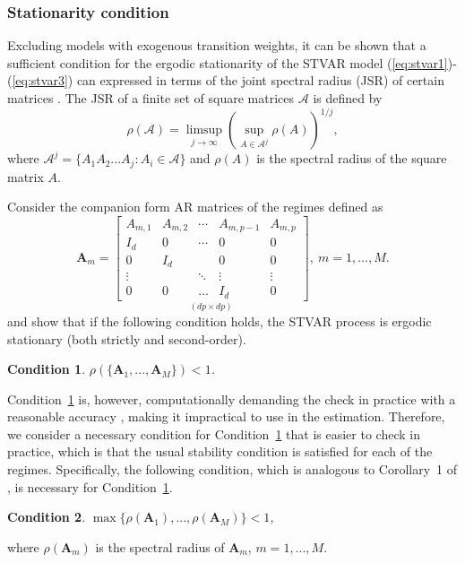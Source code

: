 \documentclass[nojss]{jss}
\newtheorem{condition}{Condition}
\begin{document}
\subsubsection{Stationarity condition}\label{sec:stationarity}
Excluding models with exogenous transition weights, it can be shown that a sufficient condition for the ergodic stationarity of the STVAR model (\ref{eq:stvar1})-(\ref{eq:stvar3}) can expressed in terms of the joint spectral radius (JSR) of certain matrices \citep{Kheifets+Saikkonen:2020}. The JSR of a finite set of square matrices $\mathcal{A}$ is defined by
\begin{equation}
\rho(\mathcal{A}) = \underset{j\rightarrow \infty}{\limsup}\left(\underset{A\in \mathcal{A}^j}{\sup}\rho(A) \right)^{1/j},
\end{equation}
where $\mathcal{A}^j=\lbrace A_1A_2...A_j:A_i\in\mathcal{A}\rbrace$ and $\rho(A)$ is the spectral radius of the square matrix $A$.

Consider the companion form AR matrices of the regimes defined as
\begin{equation}\label{eq:boldA}
\boldsymbol{A}_m =
\underset{(dp\times dp)}{\begin{bmatrix}
A_{m,1} & A_{m,2} & \cdots & A_{m,p-1} & A_{m,p} \\
I_d  & 0     & \cdots & 0            & 0 \\
0     & I_d  &             & 0            & 0 \\
\vdots &   & \ddots & \vdots    & \vdots \\
0     & 0     & \hdots & I_d         & 0
\end{bmatrix}}, \
m=1,...,M.
\end{equation}
\citet[][Theorem 1]{Kheifets+Saikkonen:2020} and \cite{Lanne+Virolainen:2024} \citep[see also][]{Saikkonen:2008} show that if the following condition holds, the STVAR process is ergodic stationary (both strictly and second-order).
\begin{condition}\label{cond:sufficient}
$\rho(\lbrace \boldsymbol{A}_1,...,\boldsymbol{A}_M \rbrace) < 1$.
\end{condition}

Condition~\ref{cond:sufficient} is, however, computationally demanding the check in practice with a reasonable accuracy \citep[e.g.,][]{Chang+Blondel:2013}, making it impractical to use in the estimation. Therefore, we consider a necessary condition for Condition~\ref{cond:sufficient} that is easier to check in practice, which is that the usual stability condition is satisfied for each of the regimes. Specifically, the following condition, which is analogous to Corollary~1 of \cite{Kheifets+Saikkonen:2020}, is necessary for Condition~\ref{cond:sufficient}.
\begin{condition}\label{cond:necessary}
$\max\lbrace \rho(\boldsymbol{A}_1),...,\rho(\boldsymbol{A}_M)\rbrace<1$,
\end{condition}
where $\rho(\boldsymbol{A}_m)$ is the spectral radius of $\boldsymbol{A}_m$, $m=1,...,M$.
\end{document}
